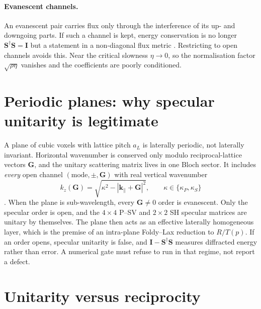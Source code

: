 \documentclass[11pt,a4paper]{article}
\newcommand{\bI}{\mathbf{I}}
\newcommand{\bS}{\mathbf{S}}
\newcommand{\kpar}{\mathbf{k}_{\parallel}}
\newcommand{\herm}{^{\dagger}}
\begin{document}
\paragraph{Evanescent channels.} An evanescent pair carries flux only
through the interference of its up- and downgoing parts. If such a
channel is kept, energy conservation is no longer $\bS\herm\bS = \bI$
but a statement in a non-diagonal flux metric
\citep{Newton1982}. Restricting to open channels avoids this.
Near the critical slowness $\eta \to 0$, so the normalisation factor
$\sqrt{\rho\eta}$ vanishes and the coefficients are poorly conditioned.

\section{Periodic planes: why specular unitarity is legitimate}
\label{sec:periodic}

A plane of cubic voxels with lattice pitch $a_L$ is laterally periodic,
not laterally invariant. Horizontal wavenumber is conserved only modulo
reciprocal-lattice vectors $\mathbf{G}$, and the unitary scattering
matrix lives in one Bloch sector. It includes \emph{every} open
channel $(\text{mode}, \pm, \mathbf{G})$ with real vertical
wavenumber
\begin{equation}
  k_z(\mathbf{G}) = \sqrt{\kappa^2 - |\kpar + \mathbf{G}|^2},
  \qquad \kappa \in \{\kappa_P, \kappa_S\}
  \label{eq:kz}
\end{equation}
\citep{Rayleigh1907,Petit1980}. When the plane is sub-wavelength, every
$\mathbf{G} \neq 0$ order is evanescent. Only the specular order is
open, and the $4\times4$ P--SV and $2\times2$ SH specular matrices are
unitary by themselves. The plane then acts as an effective laterally
homogeneous layer, which is the premise of an intra-plane Foldy--Lax
reduction to $R/T(p)$. If an order opens, specular unitarity is false,
and $\bI - \bS\herm\bS$ measures diffracted energy rather than error.
A numerical gate must refuse to run in that regime, not report a
defect.

\section{Unitarity versus reciprocity}
\label{sec:reciprocity}
\end{document}
